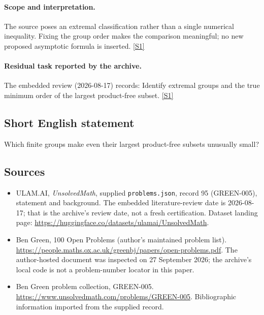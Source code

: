 \documentclass[11pt,a4paper]{article}
\newcommand{\sref}[2]{\hyperlink{source:#1:#2}{[S#2]}}
\begin{document}
\paragraph{Scope and interpretation.}

The source poses an extremal classification rather than a single numerical inequality. Fixing the group order makes the comparison meaningful; no new proposed asymptotic formula is inserted. \sref{95}{1}

\paragraph{Residual task reported by the archive.}

The embedded review (2026-08-17) records: Identify extremal groups and the true minimum order of the largest product-free subset. \sref{95}{1}

\subsection{Short English statement}

Which finite groups make even their largest product-free subsets unusually small?

\subsection{Sources}

{\small

\begin{itemize}

\item[\hypertarget{source:95:1}{S1}] ULAM.AI, \emph{UnsolvedMath}, supplied \texttt{problems.json}, record 95 (GREEN-005), statement and background. The embedded literature-review date is 2026-08-17; that is the archive’s review date, not a fresh certification. Dataset landing page: \url{https://huggingface.co/datasets/ulamai/UnsolvedMath}.

\item[\hypertarget{source:95:2}{S2}] Ben Green, 100 Open Problems (author’s maintained problem list). \url{https://people.maths.ox.ac.uk/greenbj/papers/open-problems.pdf}. The author-hosted document was inspected on 27 September 2026; the archive’s local code is not a problem-number locator in this paper.

\item[\hypertarget{source:95:3}{S3}] Ben Green problem collection, GREEN-005. \url{https://www.unsolvedmath.com/problems/GREEN-005}. Bibliographic information imported from the supplied record.

\end{itemize}

}

\label{end:95}
\end{document}
